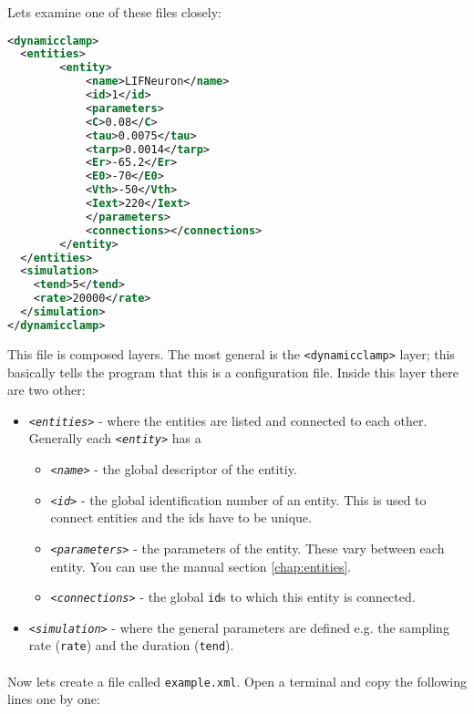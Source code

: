Lets examine one of these files closely:

\renewcommand{\lstlistingname}{Example}
\begin{lstlisting}[caption={A simple example of a configuration file with a simulated integrate and fire neuron.},label={gettingStarted:example0},language=XML,morekeywords={dynamic clamp,entities,entity,name,id,C,tau,tarp,Er,E0,Vth,Iext,parameters,connections,simulation,tend,rate}]
<dynamicclamp>
  <entities>
    	<entity>
      		<name>LIFNeuron</name>
      		<id>1</id>
      		<parameters>
			<C>0.08</C>
			<tau>0.0075</tau>
			<tarp>0.0014</tarp>
			<Er>-65.2</Er>
			<E0>-70</E0>
			<Vth>-50</Vth>
			<Iext>220</Iext>
      		</parameters>
      		<connections></connections>
    	</entity>
  </entities>
  <simulation>
  	<tend>5</tend>
   	<rate>20000</rate>
  </simulation>
</dynamicclamp>

\end{lstlisting}
 
This file is composed layers. The most general is the \texttt{<dynamicclamp>} layer; this basically tells the program that this is a configuration file. Inside this layer there are two other:
\begin{itemize}
\item
\emph{ \texttt{<entities>}}  - where the entities are listed and connected to each other. Generally each \emph{ \texttt{<entity>}} has a 
	\begin{itemize}
	\item \emph{ \texttt{<name>}} - the global descriptor of the entitiy. 
	\item \emph{ \texttt{<id>}} - the global identification number of an entity. This is used to connect entities and the ids have to be unique.
	\item \emph{ \texttt{<parameters>}} - the parameters of the entity. These vary between each entity. You can use the manual section \ref{chap:entities}.
	\item \emph{ \texttt{<connections>}} - the global \texttt{id}s to which this entity is connected.
	\end{itemize}
\item
\emph{ \texttt{<simulation>}} - where the general parameters are defined e.g. the sampling rate (\texttt{rate}) and the duration (\texttt{tend}).
\end{itemize}

\paragraph{}
Now lets create a file called \texttt{example.xml}. Open a terminal and copy the following lines one by one:

